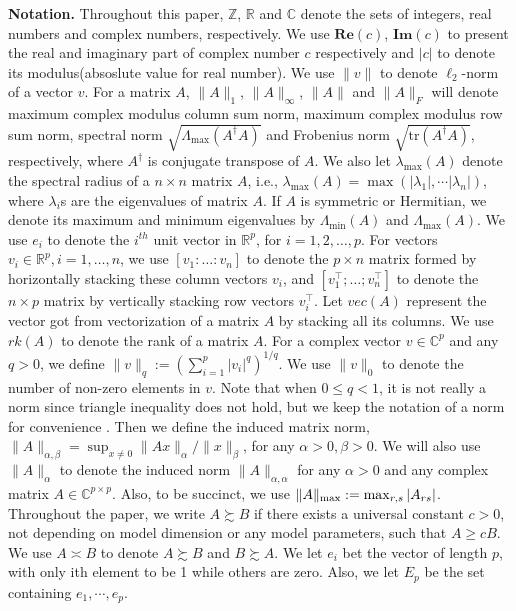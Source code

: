 \textbf{Notation.} Throughout this paper, $\mathbb{Z}$, $\mathbb{R}$ and $\mathbb{C}$  denote the sets of integers, real numbers and complex numbers, respectively. We use 
$\mathbf{Re}(c)$, $\mathbf{Im}(c)$ to present the real and imaginary part of complex number $c$ respectively and $|c|$ to denote its modulus(absoslute value for real number). We use $\|v\|$ to denote $\ell_2$-norm of a vector $v$. For a matrix $A$, $\|A\|_1$, $\|A\|_{\infty}$, $\|A\|$ and $\|A\|_F$ will denote maximum complex modulus column sum norm, maximum complex modulus row sum norm, { spectral norm} $\sqrt{\Lambda_{\max}(A^\dag A)}$ and Frobenius norm $\sqrt{\text{tr}(A^\dag A)}$, respectively, where $A^\dag$ is conjugate transpose of $A$. We also let $\lambda_{\text{max}}(A)$ denote the spectral radius of a $n \times n$ matrix $A$, i.e., $\lambda_{\text{max}}(A) = \max(|\lambda_1|, \cdots |\lambda_n|)$, where $\lambda_i$s are the eigenvalues of matrix $A$. If $A$ is symmetric or Hermitian, we denote its maximum and minimum eigenvalues by $\Lambda_{\min}(A)$ and $\Lambda_{\max}(A)$. We use $e_i$ to denote the $i^{th}$ unit vector in $\mathbb{R}^p$, for $i = 1, 2, \ldots, p$. For vectors $v_i \in \mathbb{R}^p, i=1,\ldots, n$, we use $[v_1:\ldots:v_n]$ to denote the $p \times n$ matrix formed  by horizontally stacking these column vectors $v_i$, and  $[v_1^\top;\ldots; v_n^\top]$ to denote the $n\times p$ matrix by vertically stacking row vectors $v_i^\top$. Let $vec(A)$ represent the vector got from vectorization of a matrix $A$ by stacking all its columns. We use $rk(A)$ to denote the rank of a matrix $A$. For a complex vector $v\in \mathbb{C}^p$ and any $q > 0$, we define $\|v\|_q:= (\sum_{i=1}^p |v_i|^q)^{1/q}$. We use $\|v\|_0$ to denote the number of non-zero elements in $v$. Note that when $0\le q<1$, it is not really a norm since triangle inequality does not hold, but we keep the notation of a norm for convenience . Then we define the induced matrix norm, $\|A\|_{\alpha, \beta} = \sup_{x\neq 0}\|Ax\|_\alpha/\|x\|_\beta$, for any  $\alpha>0, \beta>0$. We will also use $\|A\|_\alpha$ to denote the induced norm $\|A\|_{\alpha, \alpha}$ for any $\alpha > 0$ and any complex matrix $A \in \mathbb{C}^{p \times p}$. Also, to be succinct, we use $\|A\|_{\rm{max}} :=\max_{r,s}|A_{rs}|$. 
Throughout the paper, we write $A \succsim B$ if there exists a  universal constant $c > 0$, not depending on model dimension or any model parameters, such that $A \ge cB$. We use $A \asymp B$ to denote $A \succsim B$ and $B \succsim A$.  We let $e_i$ bet the vector of length $p$, with only ith element to be 1 while others are zero. Also, we let $E_p$ be the set containing $e_1, \cdots, e_p$. 










